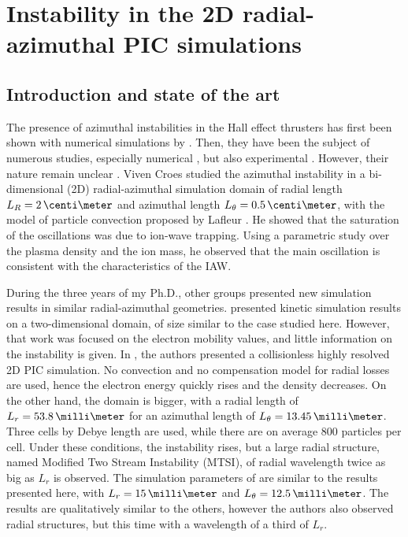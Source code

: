 
\section{Instability in the \acs{2D} radial-azimuthal \acs{PIC} simulations}
  \label{sec-PIC-ECDI}
  
  \subsection{Introduction and state of the art} \label{subsec-indroECDI}
        
    The presence of azimuthal instabilities in the Hall effect thrusters has first been shown with numerical simulations by \citet{adam2004}.
    Then, they have been the subject of numerous studies, especially numerical \citep{ducrocq2006,lafleur2016,lafleur2016a,croes2017,croes2018,janhunen2018,taccogna2019}, but also experimental \citep{honore2011,cavalier2013,cavalier2013a}.
    However, their nature remain unclear \citep{boeuf2018}.
    Viven Croes studied the azimuthal instability in a bi-dimensional (\acs{2D}) radial-azimuthal simulation domain of radial length $L_R=2\,\centi\meter$ and azimuthal length $L_{\theta}=0.5\,\centi\meter$, with the model of particle convection proposed by Lafleur \citep{croes2017,croes2018}.
    He showed that the saturation of the oscillations was due to ion-wave trapping.
    Using a parametric study over the plasma density and the ion mass, he observed that the main oscillation is consistent with the characteristics of the \ac{IAW}.
    
    During the three years of my Ph.D., other groups presented new simulation results in similar radial-azimuthal geometries.
    \citet{hara2019a} presented kinetic simulation results on a two-dimensional domain, of size similar to the case studied here.
    However, that work was focused on the electron mobility values, and little information on the instability is given.
    In \citet{janhunen2018}, the authors presented a collisionless highly resolved \acs{2D} \ac{PIC} simulation.
    No convection and no compensation model for radial losses are used, hence the electron energy quickly rises and the density decreases.
    On the other hand, the domain is bigger, with a radial length of $L_r = 53.8\,\milli\meter$ for an azimuthal length of $L_{\theta} = 13.45 \,\milli\meter$.
    Three cells by Debye length are used, while there are on average 800 particles per cell.
    Under these conditions, the instability rises, but a large radial structure, named Modified Two Stream Instability (MTSI), of radial wavelength twice as big as $L_r$  is observed.
    The simulation parameters of \citet{taccogna2019} are similar to the results presented here, with  $L_r = 15\,\milli\meter$ and $L_{\theta} = 12.5 \,\milli\meter$.
    The results are qualitatively similar to the others, however the authors also observed radial structures, but this time with a wavelength of a third of $L_r$.
        
